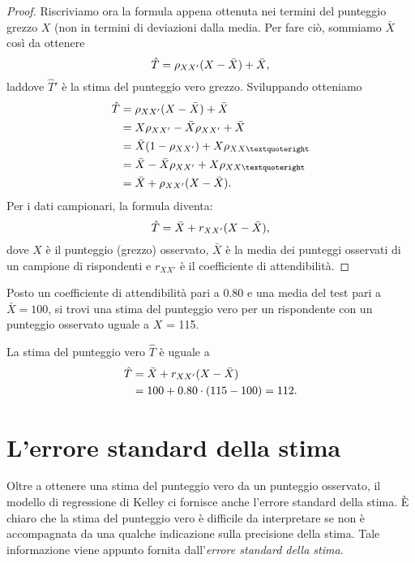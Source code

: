 \begin{proof}
Riscriviamo ora la formula appena ottenuta nei termini del punteggio grezzo $X$ (non in termini di deviazioni dalla media. 
Per fare ciò, sommiamo $\bar{X}$ così da ottenere 
\begin{equation}
\hat{T} = \rho_{XX'} (X - \bar{X}) + \bar{X}, \notag
\end{equation}
laddove $\hat{T}'$ è la stima del punteggio vero grezzo. Sviluppando otteniamo
\begin{align}
\hat{T} &= \rho_{XX'} (X - \bar{X}) + \bar{X}\notag\\
 &=  X\rho_{XX'}  - \bar{X} \rho_{XX'} + \bar{X}\notag\\
&= \bar{X} (1 - \rho_{XX'}) + X\rho_{XX’}\notag\\
&= \bar{X} - \bar{X}\rho_{XX'} + X\rho_{XX’}\notag\\
&= \bar{X} + \rho_{XX'} (X - \bar{X}).\notag
\end{align}
Per i dati campionari, la formula diventa:
\begin{equation}
\hat{T} = \bar{X} + r_{XX'}  (X - \bar{X}),\notag
\end{equation}
dove $X$ è il punteggio (grezzo) osservato, $\bar{X}$ è la media dei punteggi osservati di un campione di rispondenti e $r_{XX'}$ è il coefficiente di attendibilità. 
\end{proof}


\begin{exmp}
Posto un coefficiente di attendibilità pari a 0.80 e una media del test pari a $\bar{X} = 100$, si trovi una stima del punteggio vero per un rispondente con un punteggio osservato uguale a $X$ = 115.
\end{exmp}
\begin{solu}
La stima del punteggio vero  $\hat{T}$ è uguale a 
\begin{align}
\hat{T} &= \bar{X} + r_{XX'}  (X - \bar{X})\notag\\
&= 100 + 0.80 \cdot (115 - 100) = 112.\notag
\end{align}
\end{solu}


\section{L'errore standard della stima}

Oltre a ottenere una stima del punteggio vero da un punteggio osservato, il modello di regressione di Kelley ci fornisce anche l'errore standard della stima.
È chiaro che la stima del punteggio vero è difficile da interpretare se non è accompagnata da una qualche indicazione sulla precisione della stima. 
Tale informazione viene appunto fornita dall'\emph{errore standard della stima}.

